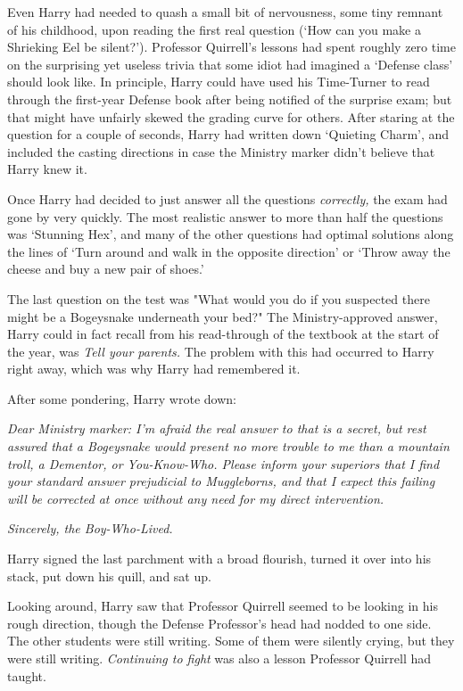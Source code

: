 Even Harry had needed to quash a small bit of nervousness, some tiny remnant of
his childhood, upon reading the first real question (`How can you make a
Shrieking Eel be silent?'). Professor Quirrell's lessons had spent roughly zero
time on the surprising yet useless trivia that some idiot had imagined a
`Defense class' should look like. In principle, Harry could have used his
Time-Turner to read through the first-year Defense book after being notified of
the surprise exam; but that might have unfairly skewed the grading curve for
others. After staring at the question for a couple of seconds, Harry had
written down `Quieting Charm', and included the casting directions in case the
Ministry marker didn't believe that Harry knew it.

Once Harry had decided to just answer all the questions \emph{correctly,} the
exam had gone by very quickly. The most realistic answer to more than half the
questions was `Stunning Hex', and many of the other questions had optimal
solutions along the lines of `Turn around and walk in the opposite direction'
or `Throw away the cheese and buy a new pair of shoes.'

The last question on the test was "What would you do if you suspected there
might be a Bogeysnake underneath your bed?" The Ministry-approved answer, Harry
could in fact recall from his read-through of the textbook at the start of the
year, was \emph{Tell your parents.} The problem with this had occurred to Harry
right away, which was why Harry had remembered it.

After some pondering, Harry wrote down:

\emph{Dear Ministry marker: I'm afraid the real answer to that is a secret, but
rest assured that a Bogeysnake would present no more trouble to me than a
mountain troll, a Dementor, or You-Know-Who. Please inform your superiors that
I find your standard answer prejudicial to Muggleborns, and that I expect this
failing will be corrected at once without any need for my direct intervention.}

\emph{Sincerely, the Boy-Who-Lived.}

Harry signed the last parchment with a broad flourish, turned it over into his
stack, put down his quill, and sat up.

Looking around, Harry saw that Professor Quirrell seemed to be looking in his
rough direction, though the Defense Professor's head had nodded to one side.
The other students were still writing. Some of them were silently crying, but
they were still writing. \emph{Continuing to fight} was also a lesson Professor
Quirrell had taught.

